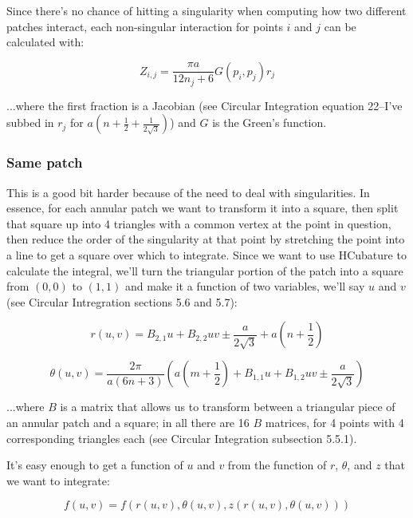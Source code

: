 \documentclass[etd,oneside,senior]{BYUPhys}
\begin{document}
Since there's no chance of hitting a singularity when computing how two different patches interact, each non-singular interaction for points $i$ and $j$ can be calculated with:

\begin{equation}
  Z_{i,j}=\frac{\pi a}{12n_{j}+6}G\left(p_{i},p_{j}\right)r_{j}
\end{equation}

...where the first fraction is a Jacobian (see Circular Integration equation 22--I've subbed in $r_{j}$ for $a\left(n+\frac{1}{2}+\frac{1}{2\sqrt{3}}\right)$) and $G$ is the Green's function.

\subsubsection{Same patch}
This is a good bit harder because of the need to deal with singularities. In essence, for each annular patch we want to transform it into a square, then split that square up into 4 triangles with a common vertex at the point in question, then reduce the order of the singularity at that point by stretching the point into a line to get a square over which to integrate. Since we want to use HCubature to calculate the integral, we'll turn the triangular portion of the patch into a square from $(0,0)$ to $(1,1)$ and make it a function of two variables, we'll say $u$ and $v$ (see Circular Intregration sections 5.6 and 5.7):

\begin{equation}
  r\left(u,v\right)=B_{2,1}u+B_{2,2}uv\pm\frac{a}{2\sqrt{3}}+a\left(n+\frac{1}{2}\right)
\end{equation}

\begin{equation}
  \theta\left(u,v\right)=\frac{2\pi}{a(6n+3)}\left(a\left(m+\frac{1}{2}\right)+B_{1,1}u+B_{1,2}uv\pm\frac{a}{2\sqrt{3}}\right)
\end{equation}

...where $B$ is a matrix that allows us to transform between a triangular
piece of an annular patch and a square; in all there are 16 $B$ matrices,
for 4 points with 4 corresponding triangles each (see Circular Integration
subsection 5.5.1).

It's easy enough to get a function of $u$ and $v$ from the function
of $r$, $\theta$, and $z$ that we want to integrate:

\begin{equation}
  f\left(u,v\right)=f\left(r\left(u,v\right),\theta\left(u,v\right),z\left(r\left(u,v\right),\theta\left(u,v\right)\right)\right)
\end{equation}
\end{document}

